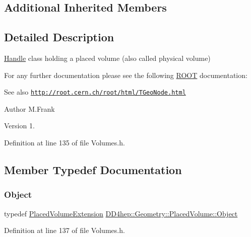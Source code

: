 \subsection*{Additional Inherited Members}


\subsection{Detailed Description}
\hyperlink{class_d_d4hep_1_1_handle}{Handle} class holding a placed volume (also called physical volume) 

For any further documentation please see the following \hyperlink{namespace_r_o_o_t}{R\+O\+OT} documentation\+: \begin{DoxySeeAlso}{See also}
\href{http://root.cern.ch/root/html/TGeoNode.html}{\tt http\+://root.\+cern.\+ch/root/html/\+T\+Geo\+Node.\+html}
\end{DoxySeeAlso}
\begin{DoxyAuthor}{Author}
M.\+Frank 
\end{DoxyAuthor}
\begin{DoxyVersion}{Version}
1. 
\end{DoxyVersion}


Definition at line 135 of file Volumes.\+h.



\subsection{Member Typedef Documentation}
\hypertarget{class_d_d4hep_1_1_geometry_1_1_placed_volume_a9ae505098ca6976164b959e1d8b4bbb0}{}\label{class_d_d4hep_1_1_geometry_1_1_placed_volume_a9ae505098ca6976164b959e1d8b4bbb0} 
\subsubsection{\texorpdfstring{Object}{Object}}
{\footnotesize\ttfamily typedef \hyperlink{class_d_d4hep_1_1_geometry_1_1_placed_volume_extension}{Placed\+Volume\+Extension} \hyperlink{class_d_d4hep_1_1_geometry_1_1_placed_volume_a9ae505098ca6976164b959e1d8b4bbb0}{D\+D4hep\+::\+Geometry\+::\+Placed\+Volume\+::\+Object}}



Definition at line 137 of file Volumes.\+h.


